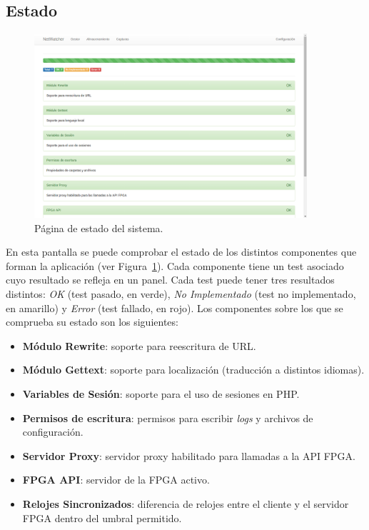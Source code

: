 \subsection{Estado\label{extra:manual:estado}}

\begin{figure}[!htp]
  \centering
  \includegraphics[width=0.9\textwidth,clip=true]{graphics/capturas/estado}
  \caption{Página de estado del sistema.}
  \label{fig:captura:estado}
\end{figure}

En esta pantalla se puede comprobar el estado de los distintos componentes que forman la aplicación (ver Figura~\ref{fig:captura:estado}).
Cada componente tiene un test asociado cuyo resultado se refleja en un panel.
Cada test puede tener tres resultados distintos: \textit{OK} (test pasado, en verde), \textit{No Implementado} (test no implementado, en amarillo) y \textit{Error} (test fallado, en rojo).
Los componentes sobre los que se comprueba su estado son los siguientes:
\begin{itemize}
  \item \textbf{Módulo Rewrite}: soporte para reescritura de \gls{URL}.
  \item \textbf{Módulo Gettext}: soporte para localización (traducción a distintos idiomas).
  \item \textbf{Variables de Sesión}: soporte para el uso de sesiones en \gls{PHP}.
  \item \textbf{Permisos de escritura}: permisos para escribir \textit{logs} y archivos de configuración.
  \item \textbf{Servidor Proxy}: servidor proxy habilitado para llamadas a la API \gls{FPGA}.
  \item \textbf{\gls{FPGA} API}: servidor de la \gls{FPGA} activo.
  \item \textbf{Relojes Sincronizados}: diferencia de relojes entre el cliente y el servidor \gls{FPGA} dentro del umbral permitido.
\end{itemize}

